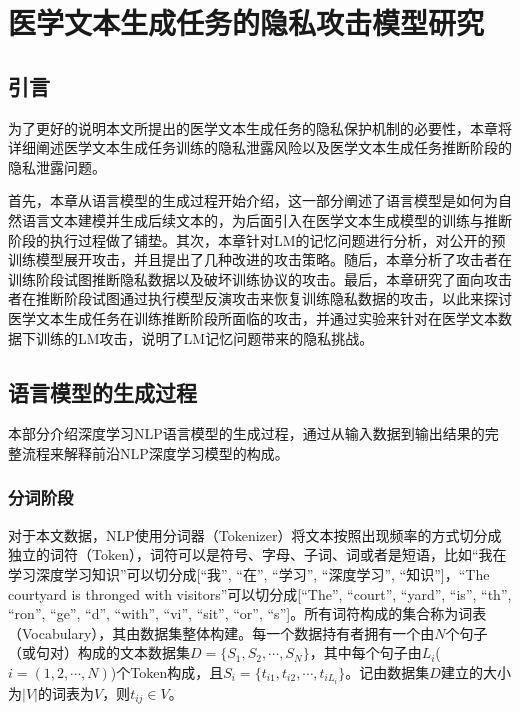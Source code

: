 
\chapter{医学文本生成任务的隐私攻击模型研究}

\section{引言}

为了更好的说明本文所提出的医学文本生成任务的隐私保护机制的必要性，本章将详细阐述医学文本生成任务训练的隐私泄露风险以及医学文本生成任务推断阶段的隐私泄露问题。

首先，本章从语言模型的生成过程开始介绍，这一部分阐述了语言模型是如何为自然语言文本建模并生成后续文本的，为后面引入在医学文本生成模型的训练与推断阶段的执行过程做了铺垫。其次，本章针对LM的记忆问题进行分析，对公开的预训练模型展开攻击，并且提出了几种改进的攻击策略。随后，本章分析了攻击者在训练阶段试图推断隐私数据以及破坏训练协议的攻击。最后，本章研究了面向攻击者在推断阶段试图通过执行模型反演攻击来恢复训练隐私数据的攻击，以此来探讨医学文本生成任务在训练推断阶段所面临的攻击，并通过实验来针对在医学文本数据下训练的LM攻击，说明了LM记忆问题带来的隐私挑战。

\section{语言模型的生成过程}

本部分介绍深度学习NLP语言模型的生成过程，通过从输入数据到输出结果的完整流程来解释前沿NLP深度学习模型的构成。

\subsection{分词阶段}

对于本文数据，NLP使用分词器（Tokenizer）将文本按照出现频率的方式切分成独立的词符（Token），词符可以是符号、字母、子词、词或者是短语，比如“我在学习深度学习知识”可以切分成[“我”, “在”, “学习”, “深度学习”, “知识”]，“The courtyard is thronged with visitors”可以切分成[“The”, “court”, “yard”, “is”, “th”, “ron”, “ge”, “d”, “with”, “vi”, “sit”, “or”, “s”]。所有词符构成的集合称为词表（Vocabulary），其由数据集整体构建。每一个数据持有者拥有一个由$N$个句子（或句对）构成的文本数据集$D=\{S_1,S_2,\cdots,S_N\}$，其中每个句子由$L_i$($i=(1,2,\cdots,N)$)个Token构成，且$S_i=\{t_{i1}, t_{i2}, \cdots,t_{iL_i}\}$。记由数据集$D$建立的大小为$|V|$的词表为$V$，则$t_{ij}\in V$。

